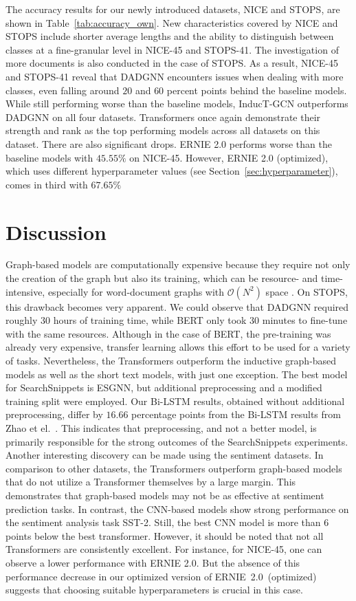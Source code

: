 \documentclass[runningheads]{llncs}
\begin{document}
The accuracy results for our newly introduced datasets, NICE and STOPS, are shown in Table~\ref{tab:accuracy_own}.
New characteristics covered by NICE and STOPS include shorter average lengths and the ability to distinguish between classes at a fine-granular level in NICE-45 and STOPS-41.
The investigation of more documents is also conducted in the case of STOPS.
As a result, NICE-45 and STOPS-41 reveal that DADGNN encounters issues when dealing with more classes, even  falling around $20$ and $60$ percent points behind the baseline models.
While still performing worse than the baseline models, InducT-GCN outperforms DADGNN on all four datasets.
Transformers once again demonstrate their strength and rank as the top performing models across all datasets on this dataset. There are also significant drops. ERNIE 2.0 performs worse than the baseline models with $45.55\%$ on NICE-45. 
However, ERNIE 2.0 (optimized), which uses different hyperparameter values (see Section~\ref{sec:hyperparameter}), comes in third with $67.65\%$

\section{Discussion}
\label{sec:discussion}

Graph-based models are computationally expensive because they require not only the creation of the graph but also its training, which can be resource- and time-intensive, especially for word-document graphs with $\mathcal{O}(N^2)$ space \cite{galkeMLP}.
On STOPS, this drawback becomes very apparent. We could observe that DADGNN required roughly $30$ hours of training time, while BERT only took $30$ minutes to fine-tune with the same resources.
Although in the case of BERT, the pre-training was already very expensive, transfer learning allows this effort to be used for a variety of tasks.
Nevertheless, the Transformers outperform the inductive graph-based models as well as the short text models, with just one exception.
The best model for SearchSnippets is ESGNN, but additional preprocessing and a modified training split were employed.
Our Bi-LSTM results, obtained without additional preprocessing, differ by $16.66$ percentage points from the Bi-LSTM results from Zhao et el.~\cite{zhao2021sequential}. 
This indicates that preprocessing, and not a better model, is primarily responsible for the strong outcomes of the SearchSnippets experiments.
Another interesting discovery can be made using the sentiment datasets. In comparison to other datasets, the Transformers outperform graph-based models that do not utilize a Transformer themselves by a large margin. This demonstrates that graph-based models may not be as effective at sentiment prediction tasks.
In contrast, the CNN-based models show strong performance on the sentiment analysis task SST-2.
Still, the best CNN model is more than 6 points below the best transformer.
However, it should be noted that not all Transformers are consistently excellent.
For instance, for NICE-45, one can observe a lower performance with ERNIE 2.0. 
But the absence of this performance decrease in our optimized version of ERNIE~2.0~(optimized) suggests that choosing suitable hyperparameters is crucial in this case.
\end{document}
